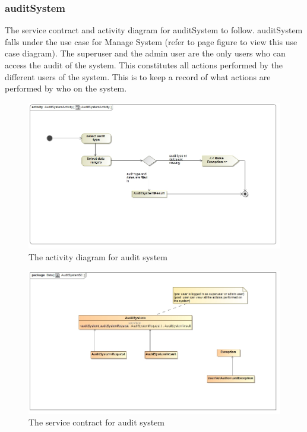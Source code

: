 \documentclass[a4paper,12pt]{report}
\begin{document}
\subsubsection{auditSystem}
The service contract and activity diagram for auditSystem to follow. auditSystem falls under the use case for Manage System (refer to page   figure   to view this use case diagram). The superuser and the admin user are the only users who can access the audit of the system.  This constitutes all actions performed by the different users of the system. This is to keep a record of what actions are performed by who on the system.
\begin{figure}[H]
  \centering
    \includegraphics[width=1.0\textwidth]{../images/AuditSystemActivity.jpg}
    \caption{The activity diagram for audit system} 
\end{figure}

\begin{figure}[H]
	\centering
	\includegraphics[width=1.0\textwidth]{../images/AuditSystemSC.jpg}
	\caption{The service contract for audit system}
\end{figure}
\end{document}
